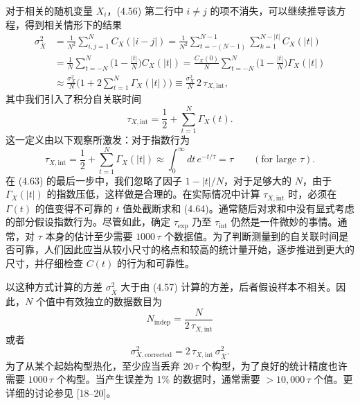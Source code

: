 对于相关的随机变量 $X_i$，(4.56) 第二行中 $i \neq j$ 的项不消失，可以继续推导该方程，得到相关情形下的结果
\begin{equation}
  \begin{split}
    \sigma_{\bar{X}}^2 &= \frac{1}{N^2}\sum_{i,j=1}^{N} C_X(|i-j|)
    = \frac{1}{N^2}\sum_{t=-(N-1)}^{N-1}\sum_{k=1}^{N-|t|} C_X(|t|) \\
    &= \frac{1}{N}\sum_{t=-N}^{N}\Big(1-\frac{|t|}{N}\Big)C_X(|t|)
    = \frac{C_X(0)}{N}\sum_{t=-N}^{N}\Big(1-\frac{|t|}{N}\Big)\Gamma_X(|t|) \\
    &\approx \frac{\sigma_X^2}{N}\Big(1 + 2\sum_{t=1}^{N}\Gamma_X(|t|)\Big)
    \equiv \frac{\sigma_X^2}{N}\,2\,\tau_{X,\mathrm{int}},
  \end{split}
\end{equation}
其中我们引入了积分自关联时间
\begin{equation}
  \tau_{X,\mathrm{int}} = \frac{1}{2} + \sum_{t=1}^{N}\Gamma_X(t) .
\end{equation}
这一定义由以下观察所激发：对于指数行为
\begin{equation}
  \tau_{X,\mathrm{int}} = \frac{1}{2} + \sum_{t=1}^{N}\Gamma_X(|t|)
  \approx \int_0^{\infty} dt\,e^{-t/\tau} = \tau \qquad (\text{for large } \tau) .
\end{equation}
在 (4.63) 的最后一步中，我们忽略了因子 $1 - |t|/N$，对于足够大的 $N$，由于 $\Gamma_X(|t|)$ 的指数压低，这样做是合理的。在实际情况中计算 $\tau_{X,\mathrm{int}}$ 时，必须在 $\Gamma(t)$ 的值变得不可靠的 $t$ 值处截断求和 (4.64)。通常随后对求和中没有显式考虑的部分假设指数行为。尽管如此，确定 $\tau_\mathrm{exp}$ 乃至 $\tau_\mathrm{int}$ 仍然是一件微妙的事情。通常，对 $\tau$ 本身的估计至少需要 $1000\,\tau$ 个数据值。为了判断测量到的自关联时间是否可靠，人们因此应当从较小尺寸的格点和较高的统计量开始，逐步推进到更大的尺寸，并仔细检查 $C(t)$ 的行为和可靠性。

以这种方式计算的方差 $\sigma_{\bar{X}}^2$ 大于由 (4.57) 计算的方差，后者假设样本不相关。因此，$N$ 个值中有效独立的数据数目为
\begin{equation}
  N_\mathrm{indep} = \frac{N}{2\,\tau_{X,\mathrm{int}}}
\end{equation}
或者
\begin{equation}
  \sigma_{X,\mathrm{corrected}}^2 = 2\,\tau_{X,\mathrm{int}}\,\sigma_{\bar{X}}^2 .
\end{equation}
为了从某个起始构型热化，至少应当丢弃 $20\,\tau$ 个构型，为了良好的统计精度也许需要 $1000\,\tau$ 个构型。当产生误差为 1\% 的数据时，通常需要 $> 10{,}000\,\tau$ 个值。更详细的讨论参见 [18--20]。

